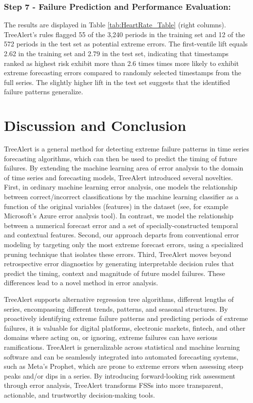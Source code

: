 \documentclass[preprint,12pt]{elsarticle}
\begin{document}
\subsubsection*{Step 7 - Failure Prediction and Performance Evaluation:}
The results are displayed in Table \ref{tab:HeartRate_Table} (right columns). TreeAlert’s rules flagged 55 of the 3,240 periods in the training set and 12 of the 572 periods in the test set as potential extreme errors.  The first-ventile lift equals 2.62 in the training set and 2.79 in the test set, indicating that timestamps ranked as highest risk exhibit more than 2.6 times times more likely to exhibit extreme forecasting errors compared to randomly selected timestamps from the full series. The slightly higher lift in the test set suggests that the identified failure patterns generalize.

\section{Discussion and Conclusion}

TreeAlert is a general method for detecting extreme failure patterns in time series forecasting algorithms, which can then be used to predict the timing of future failures. By extending the machine learning area of error analysis to the domain of time series and forecasting models, TreeAlert introduced several novelties. First, in ordinary machine learning error analysis, one models the relationship between correct/incorrect classifications by the machine learning classifier as a function of the original variables (features) in the dataset (see, for example Microsoft’s Azure error analysis tool). In contrast, we model the relationship between a numerical forecast error and a set of specially-constructed temporal and contextual features. Second, our approach departs from conventional error modeling by targeting only the most extreme forecast errors, using a specialized pruning technique that isolates these errors. Third, TreeAlert moves beyond retrospective error diagnostics by generating interpretable decision rules that predict the timing, context and magnitude of future model failures. These differences lead to a novel method in error analysis. 

 TreeAlert supports alternative regression tree algorithms, different lengths of series, encompassing different trends, patterns, and seasonal structures. By proactively identifying extreme failure patterns and predicting periods of extreme failures,  it is valuable for digital platforms, electronic markets, fintech, and other domains where acting on, or ignoring, extreme failures can have serious ramifications. TreeAlert is generalizable across statistical and machine learning software and  can be seamlessly integrated into automated forecasting systems, such as Meta’s Prophet, which are prone to extreme errors when assessing steep peaks and/or dips in a series. By introducing forward-looking risk assessment through error analysis, TreeAlert transforms FSSs into more transparent, actionable, and trustworthy decision-making tools.
\end{document}
